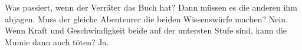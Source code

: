 
\begin{itemize}
    \bitem Was passiert, wenn der Verräter das Buch hat? Dann müssen es die anderen ihm abjagen.
    \bitem Muss der gleiche Abenteurer die beiden Wissenswürfe machen? Nein.
    \bitem Wenn Kraft und Geschwindigkeit beide auf der untersten Stufe sind, kann die Mumie dann auch töten? Ja.
\end{itemize}
